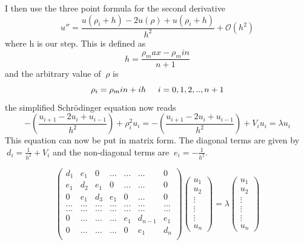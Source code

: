\documentclass[11pt,a4wide]{article}
\begin{document}
I then use the three point formula for the second derivative 
\begin{equation}
  u''=\frac{u({\rho}_i+h) -2u(\rho) + u({\rho}_i+h)}{h^2} + \mathcal{O}(h^2)
\end{equation}
where h is our step. This is defined as 
\[
  h=\frac{{\rho}_max -{\rho}_min}{n+1}
\]
and the arbitrary value of $\ \rho$ is 
\[
	{\rho}_i = {\rho}_min + ih \hspace{0.5cm} i=0,1,2,..,n+1 
\]
the simplified Schr\"odinger equation now reads
\[
 - \left( \frac{u_{i+1}-2u_i +u_{i-1}}{h^2} \right) + {\rho}^2_iu_i = - \left( \frac{u_{i+1}-2u_i +u_{i-1}}{h^2} \right) + V_i u_i = \lambda u_i
\]
This equation can now be put in matrix form. The diagonal terms are given by $\ d_i = \frac{1}{h^2} + V_i $ and the non-diagonal terms are $\ e_i = -\frac{1}{h^2}$. 

\begin{equation}
\left(\begin{array}{ccccccc}
 	d_1& e_1& 0& \dots& \dots&  \dots &0\\
    e_1& d_2& e_1& 0& \dots& \dots &0 \\
    0& e_1 &d_3 & e_1 & 0 & \dots &0\\
    \dots& \dots   & \dots &\dots   &\dots & \dots &\dots\\
    \dots &\dots &\dots &\dots &\dots &\dots &\dots \\
    0 &\dots   &\dots  &\dots &e_1 &d_{n -1}& e_1 \\
    0 &\dots    &\dots  &\dots & 0  & e_1 & d_n \\
    \end{array} \right)   \left(\begin{array}{c}
    											u_1 \\
    											u_2 \\
    											\vdots \\ \vdots \\ \vdots \\ 
    											u_n
    			                \end{array}\right) = \lambda \left(\begin{array}{c}
    											u_1 \\
    											u_2 \\
    											\vdots \\ \vdots \\ \vdots \\ 
    											u_n
    			                \end{array}\right)        
\end{equation}
\end{document}
